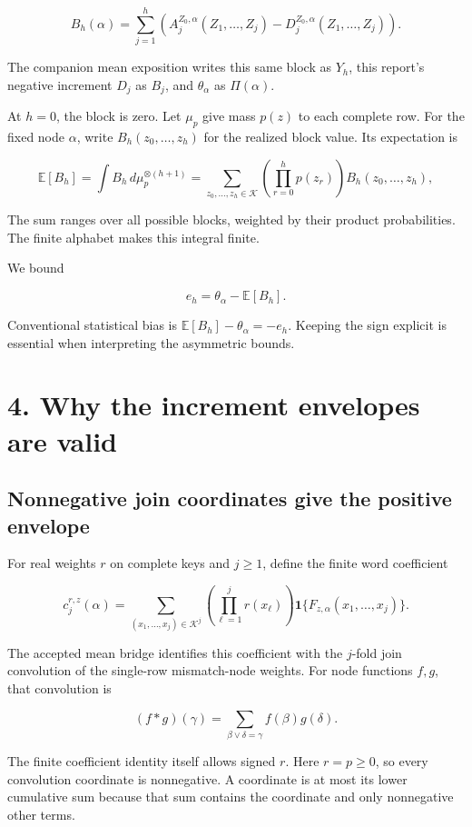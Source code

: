 \documentclass[11pt,a4paper]{article}
\begin{document}
\[
B_h(\alpha)=\sum_{j=1}^h
 \left(A_j^{Z_0,\alpha}(Z_1,\ldots,Z_j)
       -D_j^{Z_0,\alpha}(Z_1,\ldots,Z_j)\right). \tag{7}
\]

The companion mean exposition writes this same block as \(Y_h\), this report's negative increment \(D_j\) as \(B_j\), and \(\theta_\alpha\) as \(\Pi(\alpha)\).

At \(h=0\), the block is zero. Let \(\mu_p\) give mass \(p(z)\) to each complete row. For the fixed node \(\alpha\), write \(B_h(z_0,\ldots,z_h)\) for the realized block value. Its expectation is

\[
\mathbb E[B_h]
=\int B_h\,d\mu_p^{\otimes(h+1)}
=\sum_{z_0,\ldots,z_h\in\mathcal K}
 \left(\prod_{r=0}^h p(z_r)\right)B_h(z_0,\ldots,z_h), \tag{8}
\]

The sum ranges over all possible blocks, weighted by their product probabilities. The finite alphabet makes this integral finite.

We bound

\[
e_h=\theta_\alpha-\mathbb E[B_h]. \tag{9}
\]

Conventional statistical bias is \(\mathbb E[B_h]-\theta_\alpha=-e_h\). Keeping the sign explicit is essential when interpreting the asymmetric bounds.

\section{4. Why the increment envelopes are valid}\label{why-the-increment-envelopes-are-valid}

\subsection{Nonnegative join coordinates give the positive envelope}\label{nonnegative-join-coordinates-give-the-positive-envelope}

For real weights \(r\) on complete keys and \(j\ge1\), define the finite word coefficient

\[
c_j^{r,z}(\alpha)=\sum_{(x_1,\ldots,x_j)\in\mathcal K^j}
 \left(\prod_{\ell=1}^j r(x_\ell)\right)
 \mathbf1\{F_{z,\alpha}(x_1,\ldots,x_j)\}. \tag{10}
\]

The accepted mean bridge identifies this coefficient with the \(j\)-fold join convolution of the single-row mismatch-node weights. For node functions \(f,g\), that convolution is

\[
(f*g)(\gamma)=\sum_{\beta\vee\delta=\gamma}f(\beta)g(\delta).
\]

The finite coefficient identity itself allows signed \(r\). Here \(r=p\ge0\), so every convolution coordinate is nonnegative. A coordinate is at most its lower cumulative sum because that sum contains the coordinate and only nonnegative other terms.
\end{document}

